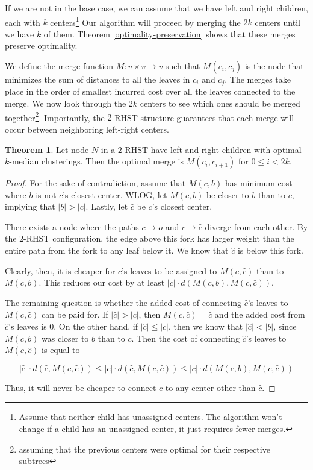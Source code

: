 \documentclass{article}
\theoremstyle{definition}
\newtheorem{theorem}{Theorem}
\begin{document}
If we are not in the base case, we can assume that we have left and right children, each with $k$ centers\footnote{Assume that neither child has
unassigned centers. The algorithm won't change if a child has an unassigned center, it just requires fewer merges.} Our algorithm will proceed by
merging the $2k$ centers until we have $k$ of them. Theorem \ref{optimality-preservation} shows that these merges preserve optimality.

We define the merge function $M : v \times v \rightarrow v$ such that $M(c_i, c_j)$ is the node that minimizes the sum of distances to all the leaves in
$c_i$ and $c_j$. The merges take place in the order of smallest incurred cost over all the leaves connected to the merge. We now look through the $2k$
centers to see which ones should be merged together\footnote{assuming that the previous centers were optimal for their respective subtrees}.
Importantly, the $2$-RHST structure guarantees that each merge will occur between neighboring left-right centers.

\begin{theorem}
    Let node $N$ in a $2$-RHST have left and right children with optimal $k$-median clusterings. Then the optimal merge is $M(c_i, c_{i+1})$ for $0 \leq i < 2k$.
\end{theorem}
\begin{proof}
    For the sake of contradiction, assume that $M(c, b)$ has minimum cost where $b$ is not $c$'s closest center. WLOG, let $M(c, b)$ be closer to $b$
    than to $c$, implying that $|b| > |c|$. Lastly, let $\hat{c}$ be $c$'s closest center.

    There exists a node where the paths $c \rightarrow o$ and $c \rightarrow \hat{c}$ diverge from each other. By the $2$-RHST configuration, the edge above
    this fork has larger weight than the entire path from the fork to any leaf below it. We know that $\hat{c}$ is below this fork.

    Clearly, then, it is cheaper for $c$'s leaves to be assigned to $M(c, \hat{c})$ than to $M(c, b)$. This reduces our cost by at least $|c| \cdot
    d\left(M(c, b), M(c, \hat{c})\right)$.

    The remaining question is whether the added cost of connecting $\hat{c}$'s leaves to $M(c, \hat{c})$ can be paid for.  If
    $|\hat{c}| > |c|$, then $M(c, \hat{c}) = \hat{c}$ and the added cost from $\hat{c}$'s leaves is 0. On the other hand, if $|\hat{c}| \leq |c|$, then we
    know that $|\hat{c}| < |b|$, since $M(c, b)$ was closer to $b$ than to $c$. Then the cost of connecting $\hat{c}$'s leaves to $M(c, \hat{c})$ is equal
    to

    \[ |\hat{c}| \cdot d(\hat{c}, M(c, \hat{c})) \leq |c| \cdot d(\hat{c}, M(c, \hat{c})) \leq |c| \cdot d\left(M(c, b), M(c, \hat{c})\right) \]

    Thus, it will never be cheaper to connect $c$ to any center other than $\hat{c}$.
\end{proof}
\end{document}
